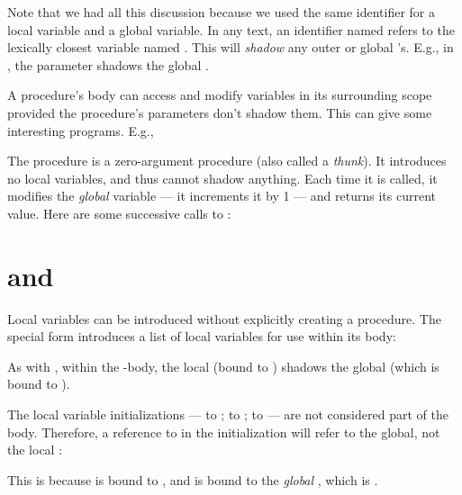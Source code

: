 
Note that we had all this discussion because we used
the same identifier for a local variable and a global
variable.  In any text, an identifier named  refers
to the lexically closest variable named .  This
will {\em shadow} any outer or global ’s.  E.g.,
in , the parameter  shadows the global
.

A procedure’s body can access and modify variables in
its surrounding scope provided the procedure’s
parameters don’t shadow them.  This can give some
interesting programs.  E.g.,


The procedure  is a zero-argument
procedure (also called a {\em thunk}).  It introduces
no local variables, and thus cannot shadow anything.
Each time it is called, it modifies the {\em global}
variable
 — it increments it by 1 — and returns
its current value.  Here are some successive calls to
:


\section{ and }

Local variables can be introduced without explicitly
creating a procedure.  The special form 
introduces a list of local variables for use within its
body:


\n As with , within the -body, the local
 (bound to ) shadows the global  (which
is bound to ).

The local variable initializations —  to ;
 to ;  to  — are not considered
part of the  body.  Therefore, a reference to
 in the initialization will refer to the global,
not the local :


\n This is because  is bound to , and  is
bound to the {\em global} , which is .

